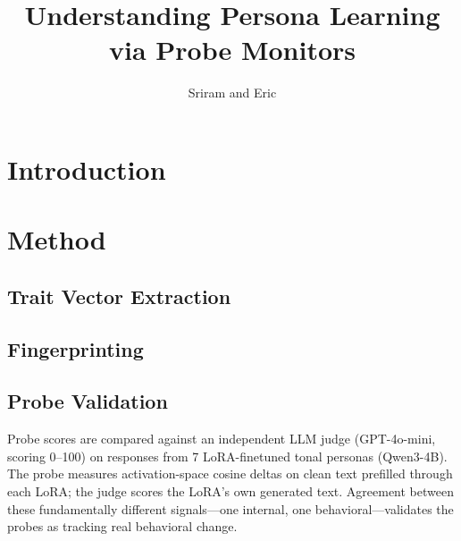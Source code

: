 \documentclass[11pt]{article}
\title{Understanding Persona Learning via Probe Monitors}
\author{Sriram and Eric}
\date{}
\begin{document}
\maketitle

\section{Introduction}



\section{Method}



\subsection{Trait Vector Extraction}

\subsection{Fingerprinting}


\subsection{Probe Validation}

Probe scores are compared against an independent LLM judge (GPT-4o-mini, scoring 0--100) on responses from 7 LoRA-finetuned tonal personas (Qwen3-4B). The probe measures activation-space cosine deltas on clean text prefilled through each LoRA; the judge scores the LoRA's own generated text. Agreement between these fundamentally different signals---one internal, one behavioral---validates the probes as tracking real behavioral change.
\end{document}
